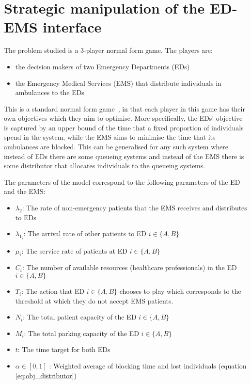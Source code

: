 \section{Strategic manipulation of the ED-EMS interface} \label{sec:model_overview}

The problem studied is a 3-player normal form game. The players are:
  
\begin{itemize}
    \item the decision makers of two Emergency Departments (EDs)
    \item the Emergency Medical Services (EMS) that distribute individuals in 
    ambulances to the EDs
\end{itemize}

This is a standard normal form game~\cite{Maschler2013},  
in that each player in this game has their own objectives which they aim to 
optimise.
More specifically, the EDs' objective is captured by an upper bound
of the time that a fixed proportion of individuals spend in the system, 
while the EMS aims to minimise the time that its ambulances 
are blocked.
This can be generalised for any such system where instead of EDs there are some
queueing systems and instead of the EMS there is some distributor that allocates
individuals to the queueing systems.

The parameters of the model correspond to the following parameters of the ED 
and the EMS:

\begin{itemize}
    \item \( \lambda_2 \): The rate of non-emergency patients that the EMS 
    receives and distributes to EDs
    \item \( \lambda_{1_i} \): The arrival rate of other patients to ED 
    \(i\in\{A, B\}\)
    \item \( \mu_i \): The service rate of patients at ED \(i\in\{A, B\}\)
    \item \( C_i \): The number of available resources (healthcare 
    professionals) in the ED \(i\in\{A, B\}\)
    \item \( T_i \): The action that ED \(i\in\{A, B\} \) chooses to play which 
    corresponds to the threshold at which they do not accept EMS patients.
    \item \( N_i \): The total patient capacity of the ED \(i\in\{A, B\} \)
    \item \( M_i \): The total parking capacity of the ED \(i\in\{A, B\} \)
    \item \( t \): The time target for both EDs
    \item \( \alpha \in [0, 1] \) : Weighted average of blocking time and 
    lost individuals (equation \ref{eq:obj_distributor})
\end{itemize}

